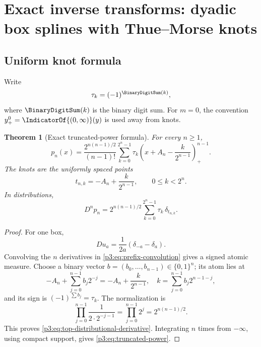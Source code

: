 \documentclass[11pt,oneside]{article}
\numberwithin{equation}{section}
\newtheorem{theorem}{Theorem}[section]
\theoremstyle{definition}
\theoremstyle{remark}
\begin{document}
\section{Exact inverse transforms: dyadic box splines with Thue--Morse knots}
\label{p3:sec:exact-spline}

\subsection{Uniform knot formula}

Write
\begin{equation}
 \tau_k=(-1)^{\BinaryDigitSum(k)},
 \label{p3:eq:tm-sign}
\end{equation}
where $\BinaryDigitSum(k)$ is the binary digit sum.  For $m=0$, the convention
$y_+^0=\IndicatorOf{(0,\infty)}(y)$ is used away from knots.

\begin{theorem}[Exact truncated-power formula]
\label{p3:thm:truncated-power}
For every $n\ge1$,
\begin{equation}
 \boxed{
 p_n(x)=\frac{2^{n(n-1)/2}}{(n-1)!}
 \sum_{k=0}^{2^n-1}\tau_k
 \left(x+A_n-\frac{k}{2^{n-1}}\right)_+^{n-1}.}
 \label{p3:eq:truncated-power}
\end{equation}
The knots are the uniformly spaced points
\begin{equation}
 t_{n,k}=-A_n+\frac{k}{2^{n-1}},
 \qquad 0\le k<2^n.
 \label{p3:eq:knots}
\end{equation}
In distributions,
\begin{equation}
 D^np_n=2^{n(n-1)/2}\sum_{k=0}^{2^n-1}\tau_k\,\delta_{t_{n,k}}.
 \label{p3:eq:top-distributional-derivative}
\end{equation}
\end{theorem}

\begin{proof}
For one box,
\[
 Du_a=\frac{1}{2a}(\delta_{-a}-\delta_a).
\]
Convolving the $n$ derivatives in \cref{p3:eq:prefix-convolution} gives a signed atomic
measure.  Choose a binary vector $b=(b_0,\ldots,b_{n-1})\in\{0,1\}^n$; its atom lies at
\[
 -A_n+\sum_{j=0}^{n-1}b_j2^{-j}
 =-A_n+\frac{k}{2^{n-1}},
 \quad
 k=\sum_{j=0}^{n-1}b_j2^{n-1-j},
\]
and its sign is $(-1)^{\sum b_j}=\tau_k$.  The normalization is
\[
 \prod_{j=0}^{n-1}\frac{1}{2\cdot2^{-j-1}}
 =\prod_{j=0}^{n-1}2^j=2^{n(n-1)/2}.
\]
This proves \cref{p3:eq:top-distributional-derivative}.  Integrating $n$ times from
$-\infty$, using compact support, gives \cref{p3:eq:truncated-power}.
\end{proof}
\end{document}
